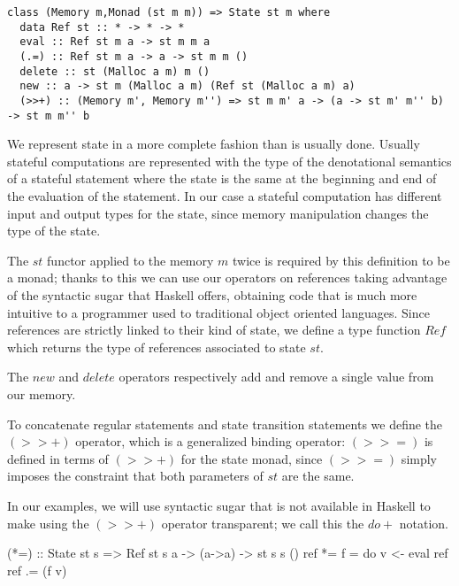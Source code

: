 \begin{lstlisting}
class (Memory m,Monad (st m m)) => State st m where
  data Ref st :: * -> * -> *
  eval :: Ref st m a -> st m m a
  (.=) :: Ref st m a -> a -> st m m ()
  delete :: st (Malloc a m) m ()
  new :: a -> st m (Malloc a m) (Ref st (Malloc a m) a)
  (>>+) :: (Memory m', Memory m'') => st m m' a -> (a -> st m' m'' b) -> st m m'' b
\end{lstlisting}

We represent state in a more complete fashion than is usually done. Usually stateful computations are represented with the type of the denotational semantics of a stateful statement where the state is the same at the beginning and end of the evaluation of the statement. In our case a stateful computation has different input and output types for the state, since memory manipulation changes the type of the state.

The $st$ functor applied to the memory $m$ twice is required by this definition to be a monad; thanks to this we can use our operators on references taking advantage of the syntactic sugar that Haskell offers, obtaining code that is much more intuitive to a programmer used to traditional object oriented languages. Since references are strictly linked to their kind of state, we define a type function $Ref$ which returns the type of references associated to state $st$.

The $new$ and $delete$ operators respectively add and remove a single value from our memory.

To concatenate regular statements and state transition statements we define the $(>>+)$ operator, which is a generalized binding operator: $(>>=)$ is defined in terms of $(>>+)$ for the state monad, since $(>>=)$ simply imposes the constraint that both parameters of $st$ are the same.

In our examples, we will use syntactic sugar that is not available in Haskell to make using the $(>>+)$ operator transparent; we call this the $do+$ notation.

(*=) :: State st s => Ref st s a -> (a->a) -> st s s ()
ref *= f = do v <- eval ref
              ref .= (f v)
